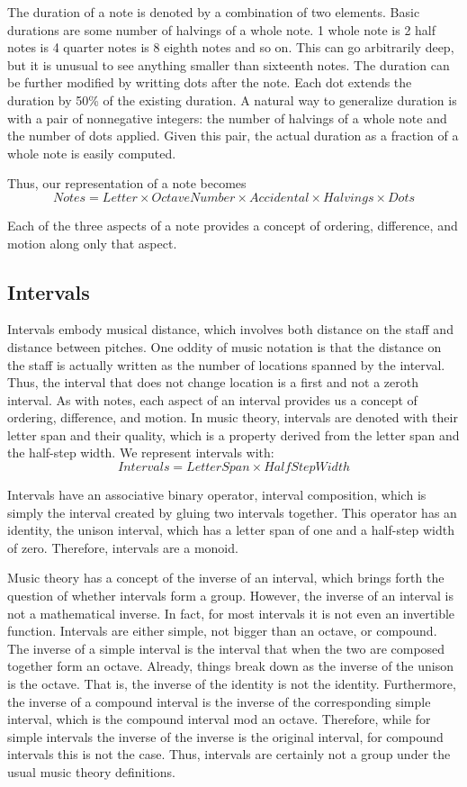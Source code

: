The duration of a note is denoted by a combination of two elements.
Basic durations are some number of halvings of a whole note.
1 whole note is 2 half notes is 4 quarter notes is 8 eighth notes and so on.
This can go arbitrarily deep, but it is unusual to see anything smaller than sixteenth notes.
The duration can be further modified by writting dots after the note.
Each dot extends the duration by 50\% of the existing duration.
A natural way to generalize duration is with a pair of nonnegative integers: the number of halvings of a whole note and the number of dots applied.
Given this pair, the actual duration as a fraction of a whole note is easily computed.

Thus, our representation of a note becomes $$ Notes = Letter \times OctaveNumber \times Accidental \times Halvings \times Dots $$

Each of the three aspects of a note provides a concept of ordering, difference, and motion along only that aspect.

\subsection{Intervals}
Intervals embody musical distance, which involves both distance on the staff and distance between pitches.
One oddity of music notation is that the distance on the staff is actually written as the number of locations spanned by the interval.
Thus, the interval that does not change location is a first and not a zeroth interval.
As with notes, each aspect of an interval provides us a concept of ordering, difference, and motion.
In music theory, intervals are denoted with their letter span and their quality, which is a property derived from the letter span and the half-step width.
We represent intervals with: $$ Intervals = LetterSpan \times HalfStepWidth $$

Intervals have an associative binary operator, interval composition, which is simply the interval created by gluing two intervals together.
This operator has an identity, the unison interval, which has a letter span of one and a half-step width of zero.
Therefore, intervals are a monoid.

Music theory has a concept of the inverse of an interval, which brings forth the question of whether intervals form a group.
However, the inverse of an interval is not a mathematical inverse. In fact, for most intervals it is not even an invertible function.
Intervals are either simple, not bigger than an octave, or compound.
The inverse of a simple interval is the interval that when the two are composed together form an octave.
Already, things break down as the inverse of the unison is the octave. That is, the inverse of the identity is not the identity.
Furthermore, the inverse of a compound interval is the inverse of the corresponding simple interval, which is the compound interval mod an octave.
Therefore, while for simple intervals the inverse of the inverse is the original interval, for compound intervals this is not the case.
Thus, intervals are certainly not a group under the usual music theory definitions.

